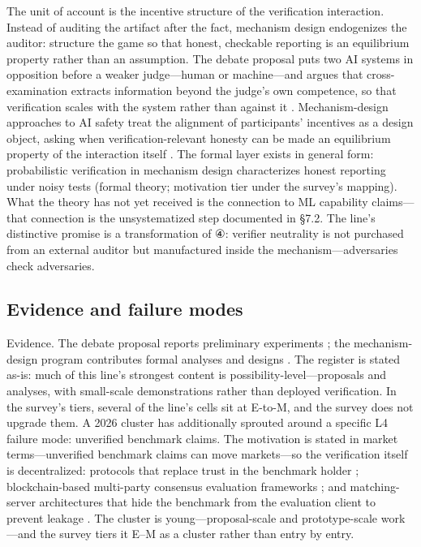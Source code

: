 \documentclass[11pt,a4paper]{article}
\begin{document}
The unit of account is the incentive structure of the verification interaction. Instead of auditing the artifact after the fact, mechanism design endogenizes the auditor: structure the game so that honest, checkable reporting is an equilibrium property rather than an assumption. The debate proposal puts two AI systems in opposition before a weaker judge—human or machine—and argues that cross-examination extracts information beyond the judge's own competence, so that verification scales with the system rather than against it \cite{key09}. Mechanism-design approaches to AI safety treat the alignment of participants' incentives as a design object, asking when verification-relevant honesty can be made an equilibrium property of the interaction itself \cite{key10}. The formal layer exists in general form: probabilistic verification in mechanism design characterizes honest reporting under noisy tests \cite{key43} (formal theory; motivation tier under the survey's mapping). What the theory has not yet received is the connection to ML capability claims—that connection is the unsystematized step documented in §7.2. The line's distinctive promise is a transformation of ④: verifier neutrality is not purchased from an external auditor but manufactured inside the mechanism—adversaries check adversaries.

\subsection{Evidence and failure modes}

Evidence. The debate proposal reports preliminary experiments \cite{key09}; the mechanism-design program contributes formal analyses and designs \cite{key10}. The register is stated as-is: much of this line's strongest content is possibility-level—proposals and analyses, with small-scale demonstrations rather than deployed verification. In the survey's tiers, several of the line's cells sit at E-to-M, and the survey does not upgrade them. A 2026 cluster has additionally sprouted around a specific L4 failure mode: unverified benchmark claims. The motivation is stated in market terms—unverified benchmark claims can move markets—so the verification itself is decentralized: protocols that replace trust in the benchmark holder \cite{key44}; blockchain-based multi-party consensus evaluation frameworks \cite{key45}; and matching-server architectures that hide the benchmark from the evaluation client to prevent leakage \cite{key46}. The cluster is young—proposal-scale and prototype-scale work—and the survey tiers it E–M as a cluster rather than entry by entry.
\end{document}
